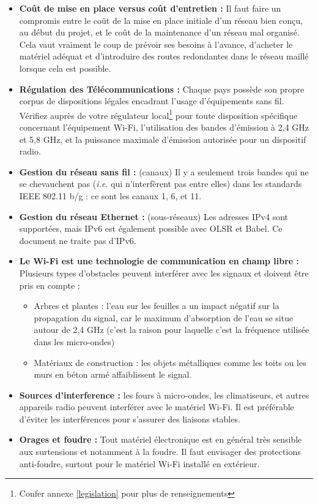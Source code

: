 \documentclass[a4paper,french,11pt,twoside]{article}
\begin{document}
\begin{itemize}
\renewcommand{\labelitemi}{$\bullet$}
    \item{\textbf{Coût de mise en place versus coût d'entretien :} Il faut faire un compromis entre le coût de la mise en place initiale d'un réseau bien conçu, au début du projet, et le coût de la maintenance d'un réseau mal organisé. Cela vaut vraiment le coup de prévoir ses besoins à l'avance, d'acheter le matériel adéquat et d'introduire des routes redondantes dans le réseau maillé lorsque cela est possible.}
    \item{\textbf{Régulation des Télécommunications :} Chaque pays possède son propre  corpus de dispositions légales encadrant l'usage d'équipements sans fil. Vérifiez auprès de votre régulateur local\footnote{Confer annexe \ref{legislation} pour plus de renseignements} pour toute disposition spécifique concernant l'équipement Wi-Fi, l'utilisation des bandes d'émission à 2,4 GHz et 5,8 GHz, et la puissance maximale d'émission autorisée pour un dispositif radio.}
    \item{\textbf{Gestion du réseau sans fil :} (canaux) Il y a seulement trois bandes qui ne se chevauchent pas (\textit{i.e.} qui n'interfèrent pas entre elles) dans les standards IEEE 802.11 b/g : ce sont les canaux 1, 6, et 11.}
    \item{\textbf{Gestion du réseau Ethernet :} (sous-réseaux) Les adresses IPv4 sont supportées, mais IPv6 est également possible avec OLSR et Babel. Ce document ne traite pas d'IPv6.}
    \item{\textbf{Le Wi-Fi est une technologie de communication en champ libre :} Plusieurs types d'obstacles peuvent interférer avec les signaux et doivent être pris en compte :}
        \begin{itemize}
            \item{Arbres et plantes : l'eau sur les feuilles a un impact négatif sur la propagation du signal, car le maximum d'absorption de l'eau se situe autour de 2,4 GHz (c'est la raison pour laquelle c'est la fréquence utilisée dans les micro-ondes)}
            \item{Matériaux de construction : les objets métalliques comme les toits ou les murs en béton armé affaiblissent le signal.}
        \end{itemize}
   \item{\textbf{Sources d'interference :} les fours à micro-ondes, les climatiseurs, et autres appareils radio peuvent interférer avec le matériel Wi-Fi. Il est préférable d'éviter les interférences pour s'assurer des liaisons stables.}
     \item{\textbf{Orages et foudre :} Tout matériel électronique est en général très sensible aux surtensions et notamment à la foudre. Il faut envisager des protections anti-foudre, surtout pour le matériel Wi-Fi installé en extérieur.}
\end{itemize}
\end{document}
